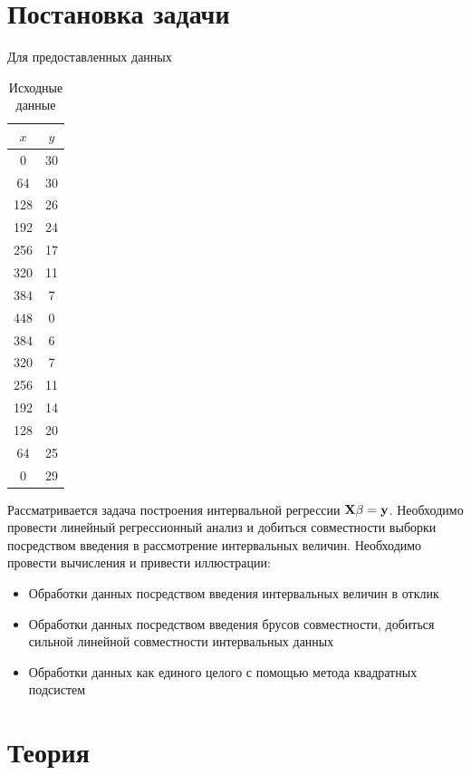 \documentclass[a4paper]{article}
\begin{document}
\section{Постановка задачи}
Для предоставленных данных 
\begin{table}[H]
    \centering
    \begin{tabular}{|c|c|}
        \hline
         $x$&$y$  \\
         \hline
         0&30\\
         \hline
         64&30\\
         \hline
         128&26\\
         \hline
         192&24\\
         \hline
         256&17\\
         \hline
         320&11\\
         \hline
         384&7\\
         \hline
         448&0\\
         \hline
         384&6\\
         \hline
         320&7\\
         \hline
         256&11\\
         \hline
         192&14\\
         \hline
         128&20\\
         \hline
         64&25\\
         \hline
         0&29\\
         \hline
    \end{tabular}
    \caption{Исходные данные}
    \label{tab:data}
\end{table}
Рассматривается задача построения интервальной регрессии $\mathbf{X}\beta=\mathbf{y}$. Необходимо провести линейный регрессионный анализ и добиться совместности выборки посредством введения в рассмотрение интервальных величин. Необходимо провести вычисления и привести иллюстрации:
\begin{itemize}
    \item Обработки данных посредством введения интервальных величин в отклик
    \item Обработки данных посредством введения брусов совместности, добиться сильной линейной совместности интервальных данных
    \item Обработки данных как единого целого с помощью метода квадратных подсистем
\end{itemize}
\section{Теория}
\end{document}
